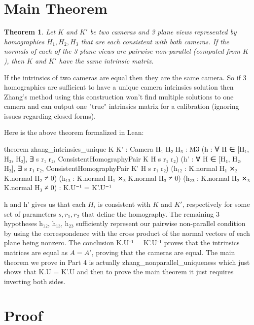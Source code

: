 \documentclass[10pt]{article}
\theoremstyle{plain}
\newtheorem{theorem}{Theorem}
\theoremstyle{definition}
\theoremstyle{remark}
\newcommand{\lean}[1]{{\ttfamily\let\us\_\def\_{\us\allowbreak}#1}}
\begin{document}
\section{Main Theorem}

\begin{theorem}
  Let $K$ and $K'$ be two cameras and 3 plane views represented by homographies $H_1,H_2,H_3$ that are each consistent with both cameras. If the normals of each of the 3 plane views are pairwise non-parallel (computed from $K$), then $K$ and $K'$ have the same intrinsic matrix.
\end{theorem}

If the intrinsics of two cameras are equal then they are the same camera. So if 3 homographies are sufficient to have a unique camera intrinsics solution then Zhang's method using this construction won't find multiple solutions to one camera and can output one "true" intrinsics matrix for a calibration (ignoring issues regarding closed forms).

Here is the above theorem formalized in Lean:

\begin{leancode}
theorem zhang_intrinsics_unique {K K' : Camera} {H₁ H₂ H₃ : M3}
    (h : ∀ H ∈ [H₁, H₂, H₃], ∃ s r₁ r₂, ConsistentHomographyPair K H s r₁ r₂)
    (h' : ∀ H ∈ [H₁, H₂, H₃], ∃ s r₁ r₂, ConsistentHomographyPair K' H s r₁ r₂)
    (h₁₂ : K.normal H₁ ⨯₃ K.normal H₂ ≠ 0) (h₁₃ : K.normal H₁ ⨯₃ K.normal H₃ ≠ 0)
    (h₂₃ : K.normal H₂ ⨯₃ K.normal H₃ ≠ 0) :
    K.U⁻¹ = K'.U⁻¹
\end{leancode}

\lean{h} and \lean{h'} gives us that each $H_i$ is consistent with $K$ and $K'$, respectively for some set of parameters $s,r_1,r_2$ that define the homography. The remaining 3 hypotheses \lean{h₁₂, h₁₃, h₂₃} sufficiently represent our pairwise non-parallel condition by using the correspondence with the cross product of the normal vectors of each plane being nonzero. The conclusion \lean{K.U⁻¹ = K'.U⁻¹} proves that the intrinsics matrices are equal as $A=A'$, proving that the cameras are equal. The main theorem we prove in Part 4 is actually \lean{zhang\_nonparallel\_uniqueness} which just shows that \lean{K.U = K'.U} and then to prove the main theorem it just requires inverting both sides.

\section{Proof}
\end{document}

